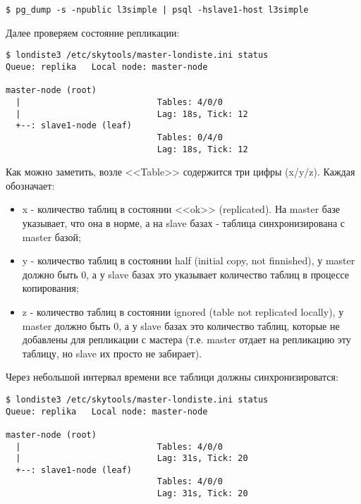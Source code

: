 \begin{lstlisting}[label=lst:londiste-replica-dump1,caption=Клонирование структуры базы]
$ pg_dump -s -npublic l3simple | psql -hslave1-host l3simple
\end{lstlisting}

Далее проверяем состояние репликации:

\begin{lstlisting}[label=lst:londiste-replica15,caption=Статус кластера]
$ londiste3 /etc/skytools/master-londiste.ini status
Queue: replika   Local node: master-node

master-node (root)
  |                           Tables: 4/0/0
  |                           Lag: 18s, Tick: 12
  +--: slave1-node (leaf)
                              Tables: 0/4/0
                              Lag: 18s, Tick: 12
\end{lstlisting}

Как можно заметить, возле <<Table>> содержится три цифры (x/y/z). Каждая обозначает:

\begin{itemize}
  \item x - количество таблиц в состоянии <<ok>> (replicated). На master базе указывает, что она в норме, а на slave базах - таблица синхронизирована с master базой;
  \item y - количество таблиц в состоянии half (initial copy, not finnished), у master должно быть 0, а у slave базах это указывает количество таблиц в процессе копирования;
  \item z - количество таблиц в состоянии ignored (table not replicated locally), у master должно быть 0, а у slave базах это количество таблиц, которые не добавлены для репликации с мастера (т.е. master отдает на репликацию эту таблицу, но slave их просто не забирает).
\end{itemize}

Через небольшой интервал времени все таблици должны синхронизироватся:

\begin{lstlisting}[label=lst:londiste-replica16,caption=Статус кластера]
$ londiste3 /etc/skytools/master-londiste.ini status
Queue: replika   Local node: master-node

master-node (root)
  |                           Tables: 4/0/0
  |                           Lag: 31s, Tick: 20
  +--: slave1-node (leaf)
                              Tables: 4/0/0
                              Lag: 31s, Tick: 20
\end{lstlisting}

